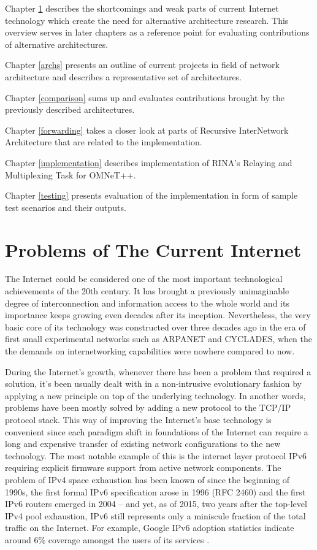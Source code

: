         Chapter \ref{problems} describes the shortcomings and weak parts of current Internet technology which create the need for alternative architecture research. This overview serves in later chapters as a reference point for evaluating contributions of alternative architectures.

        Chapter \ref{archs} presents an outline of current projects in field of network architecture and describes a representative set of architectures.

        Chapter \ref{comparison} sums up and evaluates contributions brought by the previously described architectures.

        Chapter \ref{forwarding} takes a closer look at parts of Recursive InterNetwork Architecture that are related to the implementation.

        Chapter \ref{implementation} describes implementation of RINA's Relaying and Multiplexing Task for OMNeT++.

        Chapter \ref{testing} presents evaluation of the implementation in form of sample test scenarios and their outputs.


\chapter{Problems of The Current Internet}\label{problems}

    The Internet could be considered one of the most important technological achievements of the 20th century. It has brought a previously unimaginable degree of interconnection and information access to the whole world and its importance keeps growing even decades after its inception. Nevertheless, the very basic core of its technology was constructed over three decades ago in the era of first small experimental networks such as ARPANET and CYCLADES, when the the demands on internetworking capabilities were nowhere compared to now.

    During the Internet's growth, whenever there has been a problem that required a solution, it's been usually dealt with in a non-intrusive evolutionary fashion by applying a new principle on top of the underlying technology. In another words, problems have been mostly solved by adding a new protocol to the TCP/IP protocol stack. This way of improving the Internet's base technology is convenient since each paradigm shift in foundations of the Internet can require a long and expensive transfer of existing network configurations to the new technology. The most notable example of this is the internet layer protocol IPv6 requiring explicit firmware support from active network components. The problem of IPv4 space exhaustion has been known of since the beginning of 1990s, the first formal IPv6 specification arose in 1996 (RFC 2460) and the first IPv6 routers emerged in 2004 -- and yet, as of 2015, two years after the top-level IPv4 pool exhaustion, IPv6 still represents only a miniscule fraction of the total traffic on the Internet. For example, Google IPv6 adoption statistics indicate around 6\% coverage amongst the users of its services \cite{ipv6stats}.

